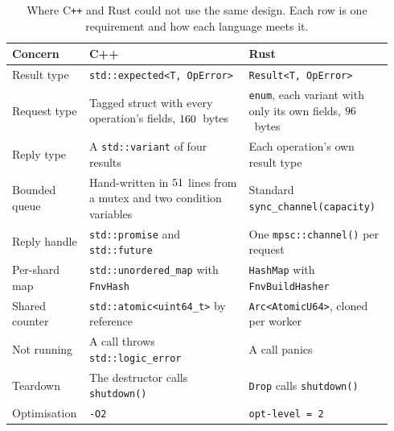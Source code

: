 \documentclass[english,oneside,a4paper,censored,csm,software-track-2020]{HYthesisML}
\begin{document}
\enlargethispage{24pt}
\begin{table}[H]
\centering
\small
\caption[Where the two languages had to differ]{Where C\texttt{++} and Rust could not use the same design. Each row is one requirement and how each language meets it.\label{tab:idioms}}
\footnotesize
\renewcommand{\arraystretch}{0.95}
\begin{tabular}{@{}R{0.16\linewidth} R{0.41\linewidth} R{0.37\linewidth}@{}}
\hline\hline
Concern & C++ & Rust \\
\hline
Result type & \texttt{std::expected<T, OpError>} & \texttt{Result<T, OpError>} \\
Request type & Tagged struct with every operation's fields, $160$~bytes & \texttt{enum}, each variant with only its own fields, $96$~bytes \\
Reply type & A \texttt{std::variant} of four results & Each operation's own result type \\
Bounded queue & Hand-written in $51$ lines from a mutex and two condition variables & Standard \texttt{sync\_channel(capacity)} \\
Reply handle & \texttt{std::promise} and \texttt{std::future} & One \texttt{mpsc::channel()} per request \\
Per-shard map & \texttt{std::unordered\_map} with \texttt{FnvHash} & \texttt{HashMap} with \texttt{FnvBuildHasher} \\
Shared counter & \texttt{std::atomic<uint64\_t>} by reference & \texttt{Arc<AtomicU64>}, cloned per worker \\
Not running & A call throws \texttt{std::logic\_error} & A call panics \\
Teardown & The destructor calls \texttt{shutdown()} & \texttt{Drop} calls \texttt{shutdown()} \\
Optimisation & \texttt{-O2} & \texttt{opt-level = 2} \\
\hline
\end{tabular}
\end{table}
\end{document}
